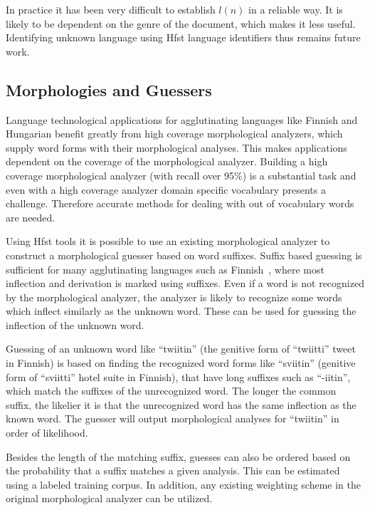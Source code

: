 \documentclass{llncs}
\begin{document}
In practice it has been very difficult to establish $l(n)$ in a
reliable way. It is likely to be dependent on the genre of the
document, which makes it less useful. Identifying unknown language
using Hfst language identifiers thus remains future work.

\subsection{Morphologies and Guessers}
\label{sec: morph-guessers}

Language technological applications for agglutinating languages like
Finnish and Hungarian benefit greatly from high coverage morphological
analyzers, which supply word forms with their morphological
analyses. This makes applications dependent on the coverage of the
morphological analyzer. Building a high coverage morphological
analyzer (with recall over 95\%) is a substantial task and even with a
high coverage analyzer domain specific vocabulary presents a
challenge. Therefore accurate methods for dealing with out of
vocabulary words are needed.

Using Hfst tools it is possible to use an existing morphological
analyzer to construct a morphological guesser based on word
suffixes. Suffix based guessing is sufficient for many agglutinating
languages such as Finnish~\cite{linden/2009/nodalida}, where most
inflection and derivation is marked using suffixes. Even if a word is
not recognized by the morphological analyzer, the analyzer is likely
to recognize some words which inflect similarly as the unknown
word. These can be used for guessing the inflection of the unknown
word.

Guessing of an unknown word like ``twiitin'' (the genitive form of
``twiitti'' tweet in Finnish) is based on finding the recognized word
forms like ``sviitin'' (genitive form of ``sviitti'' hotel suite in
Finnish), that have long suffixes such as ``-iitin'', which match the
suffixes of the unrecognized word. The longer the common suffix, the
likelier it is that the unrecognized word has the same inflection as
the known word. The guesser will output morphological analyses for
``twiitin'' in order of likelihood.

Besides the length of the matching suffix, guesses can also be ordered
based on the probability that a suffix matches a given analysis. This
can be estimated using a labeled training corpus. In addition, any
existing weighting scheme in the original morphological analyzer can
be utilized.
\end{document}
